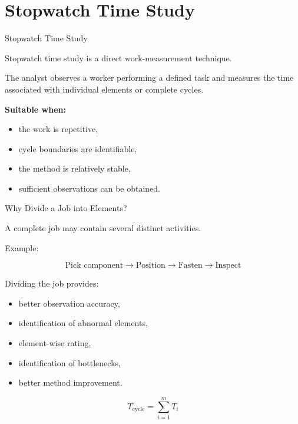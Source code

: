 \documentclass[aspectratio=169,10pt]{beamer}
\begin{document}

\section{Stopwatch Time Study}

\begin{frame}[shrink=18]{Stopwatch Time Study}
\small

Stopwatch time study is a direct work-measurement technique.

The analyst observes a worker performing a defined task and measures
the time associated with individual elements or complete cycles.

\vspace{5pt}

\textbf{Suitable when:}

\begin{itemize}
    \item the work is repetitive,
    \item cycle boundaries are identifiable,
    \item the method is relatively stable,
    \item sufficient observations can be obtained.
\end{itemize}

\end{frame}


\begin{frame}[shrink=18]{Why Divide a Job into Elements?}
\small

A complete job may contain several distinct activities.

Example:

\[
\text{Pick component}
\rightarrow
\text{Position}
\rightarrow
\text{Fasten}
\rightarrow
\text{Inspect}
\]

Dividing the job provides:

\begin{itemize}
    \item better observation accuracy,
    \item identification of abnormal elements,
    \item element-wise rating,
    \item identification of bottlenecks,
    \item better method improvement.
\end{itemize}

\vspace{5pt}

\[
\boxed{
T_{\text{cycle}}
=
\sum_{i=1}^{m} T_i
}
\]

\end{frame}
\end{document}
